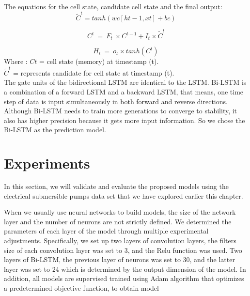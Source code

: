 The equations for the cell state, candidate cell state and the final output:
\begin{equation}
   \tilde{C}^t = tanh (wc [ht-1,xt]+ bc ) 
\end{equation}

\begin{equation}
    C^t\ =\ F_t\ \times C^{t-1}+I_t\times \tilde{C}^t
\end{equation}

\begin{equation}
    H_t\ =\ o_t\times tanh(C^t)
\end{equation}
Where :
$Ct$ = cell state (memory) at timestamp (t).\\
$\tilde{C}^t$ = represents candidate for cell state at timestamp (t).\\

The gate units of the bidirectional LSTM are identical to the LSTM. Bi-LSTM is a combination of a forward LSTM and a backward LSTM, that means, one time step of data is input simultaneously in both forward and reverse directions. Although Bi-LSTM needs to train more generations to converge to stability, it also has higher precision because it gets more input information. So we chose the Bi-LSTM as the prediction model.

\section{Experiments}

In this section, we will validate and evaluate the proposed models using the electrical submersible pumps data set that we have explored earlier this chapter. 


When we usually use neural networks to build models, the size of the network layer
and the number of neurons are not strictly defined. We determined the parameters of each layer of the model through multiple experimental adjustments. Specifically, we set up two layers of convolution layers, the filters size of each convolution layer was set to 3, and the Relu function was used. Two layers of Bi-LSTM, the previous layer of neurons was set to 30, and the latter layer was set to 24 which is determined by the output dimension of the model. In addition, all models are supervised trained using Adam algorithm that optimizes a predetermined objective function, to obtain model

